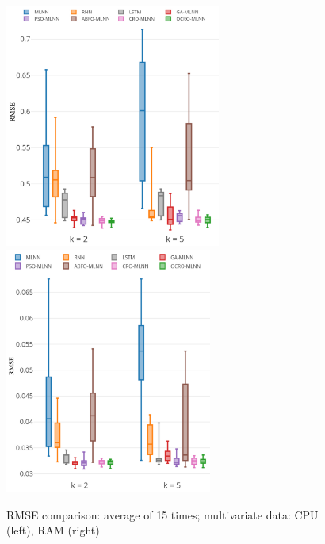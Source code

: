 \documentclass[smallcondensed, natbib]{svjour3}     %
\begin{document}
{\begin{figure}
	\centering
	\begin{minipage}[t]{1\textwidth}
		\centering
		\includegraphics[width=0.45\textwidth =0cm 0cm 0cm 0cm, height = 8cm]{images/pdf/stability/st_cpu_2.pdf}
		\centering
		\includegraphics[width=0.45\textwidth =0cm 0cm 0cm 0cm, height = 8.1cm]{images/pdf/stability/st_ram_2.pdf}
	\end{minipage}
	\caption{RMSE comparison: average of 15 times; multivariate data: CPU (left), RAM (right)} 
	\label{fig:stability_multi}
\end{figure}

}
\end{document}

